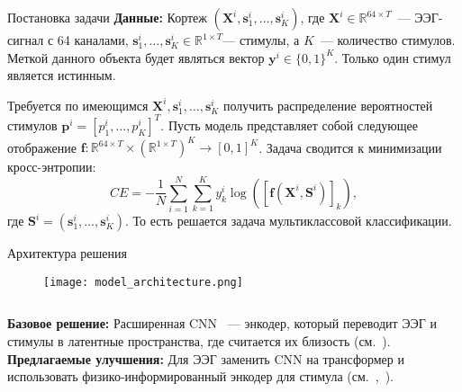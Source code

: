\documentclass{beamer}
\begin{document}
\begin{frame}{Постановка задачи}
\textbf{Данные:} Кортеж $(\mathbf{X}^i, \mathbf{s}_1^i, \dots, \mathbf{s}_K^i)$, где $\mathbf{X}^i \in \mathbb{R}^{64 \times T}$~--- ЭЭГ-сигнал с 64 каналами, $\mathbf{s}_1^i, \dots, \mathbf{s}_K^i \in \mathbb{R}^{1 \times T}$--- стимулы, а $K$~--- количество стимулов. Меткой данного объекта будет являться вектор $\mathbf{y}^i \in \{0, 1\}^K$. Только один стимул является истинным. \bigskip

Требуется по имеющимся $\mathbf{X}^i, \mathbf{s}_1^i, \dots, \mathbf{s}_K^i$ получить распределение вероятностей стимулов $\mathbf{p}^i = [p_1^i, \dots , p_K^i]^T$. Пусть модель представляет собой следующее отображение $\mathbf{f} : \mathbb{R}^{64 \times T} \times \left( \mathbb{R}^{1\times T} \right)^K \rightarrow [0, 1]^K$. Задача сводится к минимизации кросс-энтропии:
    $$CE = - \frac{1}{N}\sum_{i=1}^N\sum_{k=1}^K y_k^i \log \left( \left[ \mathbf{f}(\mathbf{X}^i, \mathbf{S}^i) \right]_k \right),$$
    где $\mathbf{S}^i = (\mathbf{s}^i_1, \dots, \mathbf{s}^i_K)$. То есть решается задача мультиклассовой классификации.

\end{frame}
\begin{frame}{Архитектура решения}
\begin{figure}[t]
        \centering
        \texttt{[image: model\_architecture.png]}
\end{figure}
\begin{columns}[c]
     \textbf{Базовое решение:} Расширенная CNN ~--- энкодер, который переводит ЭЭГ и стимулы в латентные пространства, где считается их близость (см.~\citep{Accou2021ModelingTR}).
     \textbf{Предлагаемые улучшения:}
     Для ЭЭГ заменить CNN на трансформер и использовать физико-информированный энкодер для стимула (см.~\citep{multihead-gru},~\citep{Wang2024SelfsupervisedSR}). 
\end{columns}
\end{frame}
\end{document}
